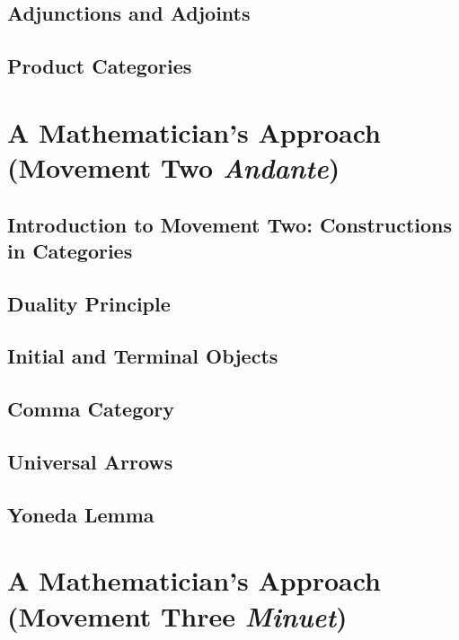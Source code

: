 \documentclass{article}
\theoremstyle{plain}
\theoremstyle{definition}
\begin{document}
\section{Adjunctions and Adjoints}

\section{Product Categories}

%

\chapter{A Mathematician's Approach (Movement Two \emph{Andante})}
\section{Introduction to Movement Two: Constructions in Categories}

\section{Duality Principle}

\section{Initial and Terminal Objects}

\section{Comma Category}

\section{Universal Arrows}

\section{Yoneda Lemma}


\chapter{A Mathematician's Approach (Movement Three \emph{Minuet})}
\end{document}
